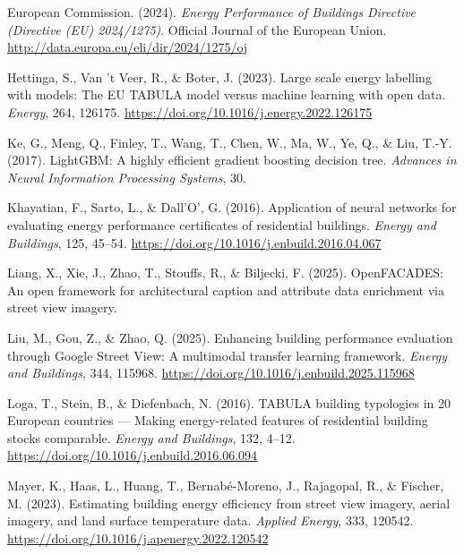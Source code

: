 \par\medskip
\noindent \hypertarget{ref:epbd2024}{}European Commission. (2024). \emph{Energy Performance of Buildings Directive (Directive (EU) 2024/1275)}. Official Journal of the European Union. \url{http://data.europa.eu/eli/dir/2024/1275/oj}
\par\medskip
\noindent \hypertarget{ref:hettinga2023}{}Hettinga, S., Van 't Veer, R., \& Boter, J. (2023). Large scale energy labelling with models: The EU TABULA model versus machine learning with open data. \emph{Energy}, 264, 126175. \url{https://doi.org/10.1016/j.energy.2022.126175}
\par\medskip
\noindent \hypertarget{ref:ke2017}{}Ke, G., Meng, Q., Finley, T., Wang, T., Chen, W., Ma, W., Ye, Q., \& Liu, T.-Y. (2017). LightGBM: A highly efficient gradient boosting decision tree. \emph{Advances in Neural Information Processing Systems}, 30.
\par\medskip
\noindent \hypertarget{ref:khayatian2016}{}Khayatian, F., Sarto, L., \& Dall'O', G. (2016). Application of neural networks for evaluating energy performance certificates of residential buildings. \emph{Energy and Buildings}, 125, 45--54. \url{https://doi.org/10.1016/j.enbuild.2016.04.067}
\par\medskip
\noindent \hypertarget{ref:liang2025}{}Liang, X., Xie, J., Zhao, T., Stouffs, R., \& Biljecki, F. (2025). OpenFACADES: An open framework for architectural caption and attribute data enrichment via street view imagery.
\par\medskip
\noindent \hypertarget{ref:liu2025}{}Liu, M., Gou, Z., \& Zhao, Q. (2025). Enhancing building performance evaluation through Google Street View: A multimodal transfer learning framework. \emph{Energy and Buildings}, 344, 115968. \url{https://doi.org/10.1016/j.enbuild.2025.115968}
\par\medskip
\noindent \hypertarget{ref:loga2016}{}Loga, T., Stein, B., \& Diefenbach, N. (2016). TABULA building typologies in 20 European countries --- Making energy-related features of residential building stocks comparable. \emph{Energy and Buildings}, 132, 4--12. \url{https://doi.org/10.1016/j.enbuild.2016.06.094}
\par\medskip
\noindent \hypertarget{ref:mayer2023uk}{}Mayer, K., Haas, L., Huang, T., Bernabé-Moreno, J., Rajagopal, R., \& Fischer, M. (2023). Estimating building energy efficiency from street view imagery, aerial imagery, and land surface temperature data. \emph{Applied Energy}, 333, 120542. \url{https://doi.org/10.1016/j.apenergy.2022.120542}
